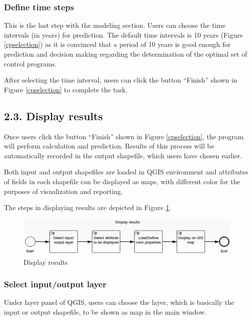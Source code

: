 \documentclass[12pt,oneside]{memoir}
\begin{document}
\subsubsection{Define time steps}
This is the last step with the modeling section. Users can choose the time intervals (in years) for prediction. The default time intervals is 10 years (Figure \ref{cpselection}) as it is convinced that a period of 10 years is good enough for prediction and decision making regarding the determination of the optimal set of control programs. 

After selecting the time interval, users can click the button ``Finish'' shown in Figure \ref{cpselection} to complete the task.
\subsection{2.3. Display results}
Once users click the button ``Finish'' shown in Figure \ref{cpselection}, the program will perform calculation and prediction. Results of this process will be automatically recorded in the output shapefile, which users have chosen earlier. 

Both input and output shapefiles are loaded in QGIS environment and attributes of fields in each shapefile can be displayed as maps, with different color for the purposes of visualization and reporting. 

The steps in displaying results are depicted in Figure \ref{output}.

\begin{figure}[H]
\centering
\includegraphics[scale=0.8]{output} 
\caption{Display results} 
\label{output}
\end{figure}
\subsubsection{Select input/output layer}
Under layer panel of QGIS, users can choose the layer, which is basically the input or output shapefile, to be shown as map in the main window. 
\end{document}
